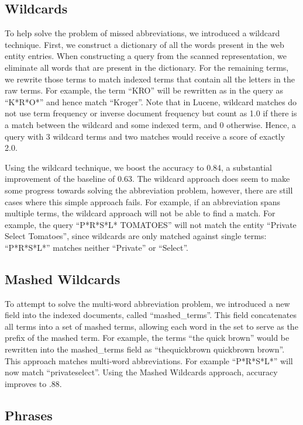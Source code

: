 \documentclass[11pt,a4paper]{article}
\begin{document}
\subsection{Wildcards}

To help solve the problem of missed abbreviations, we introduced a
wildcard technique.  First, we construct a dictionary of all the words
present in the web entity entries.  When constructing a query from the
scanned representation, we eliminate all words that are present in the
dictionary.  For the remaining terms, we rewrite those terms to match
indexed terms that contain all the letters in the raw terms.  For
example, the term ``KRO'' will be rewritten as in the query as
``K*R*O*'' and hence match ``Kroger''.  Note that in Lucene, wildcard
matches do not use term frequency or inverse document frequency but
count as 1.0 if there is a match between the wildcard and some indexed
term, and 0 otherwise.  Hence, a query with 3 wildcard terms and two
matches would receive a score of exactly 2.0.

Using the wildcard technique, we boost the accuracy to 0.84, a
substantial improvement of the baseline of 0.63.  The wildcard
approach does seem to make some progress towards solving the
abbreviation problem, however, there are still cases where this simple
approach fails.  For example, if an abbreviation spans multiple terms,
the wildcard approach will not be able to find a match.  For example,
the query ``P*R*S*L* TOMATOES'' will not match the entity ``Private
Select Tomatoes'', since wildcards are only matched against single
terms: ``P*R*S*L*'' matches neither ``Private'' or ``Select''.

\subsection{Mashed Wildcards}

To attempt to solve the multi-word abbreviation problem, we introduced
a new field into the indexed documents, called ``mashed\_terms''.  This
field concatenates all terms into a set of mashed
terms, allowing each word in the set to serve as the prefix of the
mashed term.  For example, the terms ``the quick brown'' would
be rewritten into the mashed\_terms field as ``thequickbrown quickbrown
brown''.  This approach matches multi-word abbreviations.  For example
``P*R*S*L*'' will now match ``privateselect''.  Using the Mashed
Wildcards approach, accuracy improves to .88. 

\subsection{Phrases}
\end{document}
